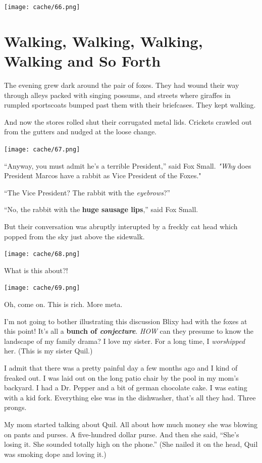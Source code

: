 \documentclass[12pt,twoside]{report}
\begin{document}
	\texttt{[image: cache/66.png]}


\section{Walking, Walking, Walking, Walking and So Forth}


The evening grew dark around the pair of foxes.  They had wound their
way through alleys packed with singing possums, and streets where
giraffes in rumpled sportscoats bumped past them with their
briefcases.  They kept walking.

And now the stores rolled shut their corrugated metal lids.  Crickets
crawled out from the gutters and nudged at the loose change.

	\texttt{[image: cache/67.png]}

``Anyway, you must admit he's a terrible President,'' said Fox
        Small. {\em "Why} does President Marcos have a rabbit as Vice
        President of the Foxes."

``The Vice President?  The rabbit with the {\em eyebrows}?''

``No, the rabbit with the {\bf huge sausage lips},'' said Fox Small.

But their conversation was abruptly interupted by a freckly cat head
which popped from the sky just above the sidewalk.

	\texttt{[image: cache/68.png]}

What is this about?!

	\texttt{[image: cache/69.png]}

Oh, come on.  This is rich.  More meta.

I'm not going to bother illustrating this discussion Blixy had with
the foxes at this point! It's all a {\bf bunch of {\em conjecture}}.
{\em HOW} can they presume to know the landscape of my family drama? I
love my sister.  For a long time, I {\em worshipped} her. (This is my
sister Quil.)

I admit that there was a pretty painful day a few months ago and I
kind of freaked out.  I was laid out on the long patio chair by the
pool in my mom's backyard.  I had a Dr. Pepper and a bit of german
chocolate cake.  I was eating with a kid fork.  Everything else was in
the dishwasher, that's all they had.  Three prongs.

My mom started talking about Quil.  All about how much money she was
blowing on pants and purses. A five-hundred dollar purse.  And then
she said, ``She's losing it. She sounded totally high on the phone.''
(She nailed it on the head, Quil was smoking dope and loving it.)
\end{document}
